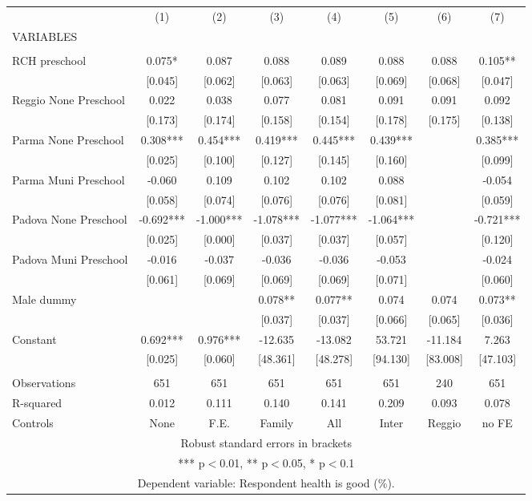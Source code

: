 \begin{tabular}{lccccccc} \hline
 & (1) & (2) & (3) & (4) & (5) & (6) & (7) \\
VARIABLES &  &  &  &  &  &  &  \\ \hline
 &  &  &  &  &  &  &  \\
RCH preschool & 0.075* & 0.087 & 0.088 & 0.089 & 0.088 & 0.088 & 0.105** \\
 & [0.045] & [0.062] & [0.063] & [0.063] & [0.069] & [0.068] & [0.047] \\
Reggio None Preschool & 0.022 & 0.038 & 0.077 & 0.081 & 0.091 & 0.091 & 0.092 \\
 & [0.173] & [0.174] & [0.158] & [0.154] & [0.178] & [0.175] & [0.138] \\
Parma None Preschool & 0.308*** & 0.454*** & 0.419*** & 0.445*** & 0.439*** &  & 0.385*** \\
 & [0.025] & [0.100] & [0.127] & [0.145] & [0.160] &  & [0.099] \\
Parma Muni Preschool & -0.060 & 0.109 & 0.102 & 0.102 & 0.088 &  & -0.054 \\
 & [0.058] & [0.074] & [0.076] & [0.076] & [0.081] &  & [0.059] \\
Padova None Preschool & -0.692*** & -1.000*** & -1.078*** & -1.077*** & -1.064*** &  & -0.721*** \\
 & [0.025] & [0.000] & [0.037] & [0.037] & [0.057] &  & [0.120] \\
Padova Muni Preschool & -0.016 & -0.037 & -0.036 & -0.036 & -0.053 &  & -0.024 \\
 & [0.061] & [0.069] & [0.069] & [0.069] & [0.071] &  & [0.060] \\
Male dummy &  &  & 0.078** & 0.077** & 0.074 & 0.074 & 0.073** \\
 &  &  & [0.037] & [0.037] & [0.066] & [0.065] & [0.036] \\
Constant & 0.692*** & 0.976*** & -12.635 & -13.082 & 53.721 & -11.184 & 7.263 \\
 & [0.025] & [0.060] & [48.361] & [48.278] & [94.130] & [83.008] & [47.103] \\
 &  &  &  &  &  &  &  \\
Observations & 651 & 651 & 651 & 651 & 651 & 240 & 651 \\
R-squared & 0.012 & 0.111 & 0.140 & 0.141 & 0.209 & 0.093 & 0.078 \\
 Controls & None & F.E. & Family & All & Inter & Reggio & no FE \\ \hline
\multicolumn{8}{c}{ Robust standard errors in brackets} \\
\multicolumn{8}{c}{ *** p$<$0.01, ** p$<$0.05, * p$<$0.1} \\
\multicolumn{8}{c}{ Dependent variable: Respondent health is good (\%).} \\
\end{tabular}

